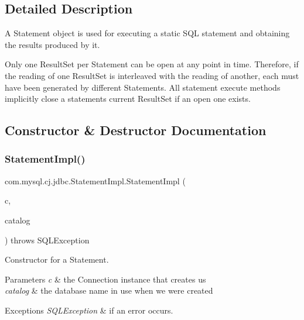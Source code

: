 \subsection{Detailed Description}
A Statement object is used for executing a static S\+QL statement and obtaining the results produced by it.

Only one Result\+Set per Statement can be open at any point in time. Therefore, if the reading of one Result\+Set is interleaved with the reading of another, each must have been generated by different Statements. All statement execute methods implicitly close a statement\textquotesingle{}s current Result\+Set if an open one exists. 

\subsection{Constructor \& Destructor Documentation}
\mbox{\label{classcom_1_1mysql_1_1cj_1_1jdbc_1_1_statement_impl_ab7415feadb30fb623edffd1b9bd40d5d}} 
\subsubsection{\texorpdfstring{Statement\+Impl()}{StatementImpl()}}
{\footnotesize\ttfamily com.\+mysql.\+cj.\+jdbc.\+Statement\+Impl.\+Statement\+Impl (\begin{DoxyParamCaption}\item[{\mbox{\hyperlink{interfacecom_1_1mysql_1_1cj_1_1jdbc_1_1_jdbc_connection}{Jdbc\+Connection}}}]{c,  }\item[{String}]{catalog }\end{DoxyParamCaption}) throws S\+Q\+L\+Exception}

Constructor for a Statement.


\begin{DoxyParams}{Parameters}
{\em c} & the Connection instance that creates us \\
\hline
{\em catalog} & the database name in use when we were created\\
\hline
\end{DoxyParams}

\begin{DoxyExceptions}{Exceptions}
{\em S\+Q\+L\+Exception} & if an error occurs. \\
\hline
\end{DoxyExceptions}


